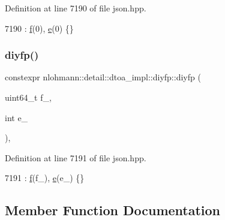 Definition at line 7190 of file json.\+hpp.


\begin{DoxyCode}
7190 : \hyperlink{structnlohmann_1_1detail_1_1dtoa__impl_1_1diyfp_a90f04c892ac1e707fdb50b0e1eb59030}{f}(0), \hyperlink{structnlohmann_1_1detail_1_1dtoa__impl_1_1diyfp_ae22e170815983961447c429f324c944d}{e}(0) \{\}
\end{DoxyCode}
\mbox{\label{structnlohmann_1_1detail_1_1dtoa__impl_1_1diyfp_a332ba792e67dd40cd99a23f6dceb7792}} 
\subsubsection{\texorpdfstring{diyfp()}{diyfp()}\hspace{0.1cm}{\footnotesize\ttfamily [2/2]}}
{\footnotesize\ttfamily constexpr nlohmann\+::detail\+::dtoa\+\_\+impl\+::diyfp\+::diyfp (\begin{DoxyParamCaption}\item[{uint64\+\_\+t}]{f\+\_\+,  }\item[{int}]{e\+\_\+ }\end{DoxyParamCaption})\hspace{0.3cm}{\ttfamily [inline]}, {\ttfamily [noexcept]}}



Definition at line 7191 of file json.\+hpp.


\begin{DoxyCode}
7191 : \hyperlink{structnlohmann_1_1detail_1_1dtoa__impl_1_1diyfp_a90f04c892ac1e707fdb50b0e1eb59030}{f}(f\_), \hyperlink{structnlohmann_1_1detail_1_1dtoa__impl_1_1diyfp_ae22e170815983961447c429f324c944d}{e}(e\_) \{\}
\end{DoxyCode}


\subsection{Member Function Documentation}
\mbox{\label{structnlohmann_1_1detail_1_1dtoa__impl_1_1diyfp_aa5f250d12ce89c81fdb08900c6a823e8}} 
